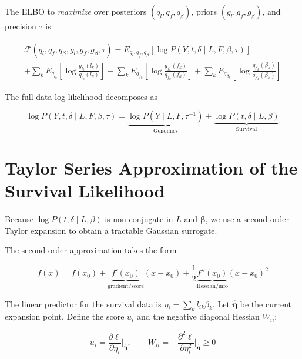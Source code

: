 \documentclass{article}[12pt]
\begin{document}
The ELBO to \emph{maximize} over posteriors $(q_l, q_f, q_\beta)$, priors
$(g_l, g_f, g_\beta)$, and precision $\tau$ is

\begin{multline}
    \mathcal{F}\!\left(q_{l}, q_{f}, q_{\beta}, g_{l}, g_{f}, g_{\beta}, \tau\right)
    = E_{q_{l}, q_{f}, q_{\beta}}\!\left[\log P\!\left(Y, t, \delta
      \mid L, F, \beta, \tau\right)\right]\\
    + \sum_{k}E_{q_{l_k}}\!\left[\log \frac{g_{l_k}(l_k)}{q_{l_k}(l_k)}\right]
    + \sum_{k}E_{q_{f_k}}\!\left[\log \frac{g_{f_k}(f_k)}{q_{f_k}(f_k)}\right]
    + \sum_{k}E_{q_{\beta_k}}\!\left[\log \frac{g_{\beta_k}(\beta_k)}{q_{\beta_k}(\beta_k)}\right]
\end{multline}

The full data log-likelihood decomposes as

\begin{equation}
    \log P\!\left(Y, t, \delta \mid L, F, \beta, \tau\right)
    = \underbrace{\log P\!\left(Y \mid L, F, \tau^{-1}\right)}_{\text{Genomics}}
    + \underbrace{\log P\!\left(t, \delta \mid L, \beta\right)}_{\text{Survival}}
\end{equation}

\section{Taylor Series Approximation of the Survival Likelihood}

Because $\log P(t, \delta \mid L, \beta)$ is non-conjugate in $L$ and
$\bm{\beta}$, we use a second-order Taylor expansion to obtain a tractable
Gaussian surrogate.

The second-order approximation takes the form

\begin{equation}
    f(x) = f(x_0) + \underbrace{f'(x_0)}_{\text{gradient/score}}(x-x_0)
            + \frac{1}{2}\underbrace{f''(x_0)}_{\text{Hessian/info}}(x-x_0)^2
\end{equation}

The linear predictor for the survival data is $\eta_i = \sum_{k}l_{ik}\beta_{k}$.
Let $\hat{\bm{\eta}}$ be the current expansion point. Define the score $u_i$
and the negative diagonal Hessian $W_{ii}$:

\begin{equation}
    u_i = \frac{\partial \ell}{\partial \eta_i}\Bigg|_{\hat{\bm{\eta}}}, \qquad
    W_{ii} = -\frac{\partial^2 \ell}{\partial \eta_i^2}\Bigg|_{\hat{\bm{\eta}}} \geq 0
\end{equation}
\end{document}
